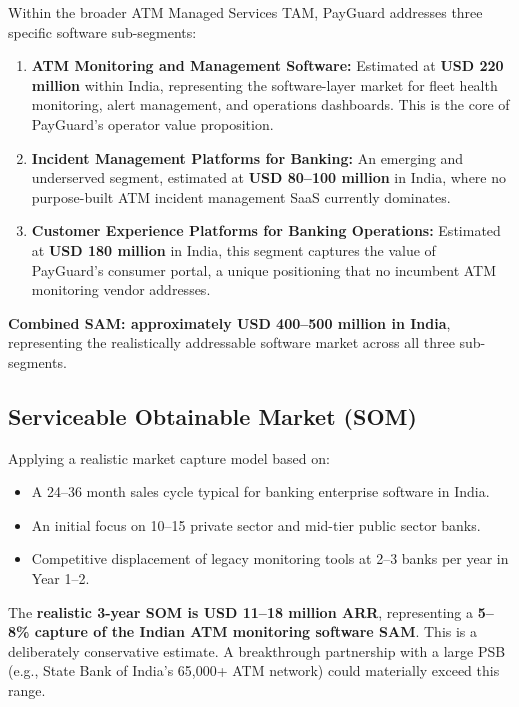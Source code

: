 \documentclass[12pt,a4paper]{article}
\begin{document}
Within the broader ATM Managed Services TAM, PayGuard addresses three specific software
sub-segments:

\begin{enumerate}
  \item \textbf{ATM Monitoring and Management Software:} Estimated at \textbf{USD 220 million}
        within India, representing the software-layer market for fleet health monitoring,
        alert management, and operations dashboards. This is the core of PayGuard's operator value
        proposition.
  \item \textbf{Incident Management Platforms for Banking:} An emerging and underserved segment,
        estimated at \textbf{USD 80--100 million} in India, where no purpose-built ATM incident
        management SaaS currently dominates.
  \item \textbf{Customer Experience Platforms for Banking Operations:} Estimated at
        \textbf{USD 180 million} in India, this segment captures the value of PayGuard's consumer
        portal, a unique positioning that no incumbent ATM monitoring vendor addresses.
\end{enumerate}

\textbf{Combined SAM: approximately USD 400--500 million in India}, representing the realistically
addressable software market across all three sub-segments.

\subsection{Serviceable Obtainable Market (SOM)}

Applying a realistic market capture model based on:
\begin{itemize}
  \item A 24--36 month sales cycle typical for banking enterprise software in India.
  \item An initial focus on 10--15 private sector and mid-tier public sector banks.
  \item Competitive displacement of legacy monitoring tools at 2--3 banks per year in Year 1--2.
\end{itemize}

The \textbf{realistic 3-year SOM is USD 11--18 million ARR}, representing a \textbf{5--8\% capture
of the Indian ATM monitoring software SAM}. This is a deliberately conservative estimate. A
breakthrough partnership with a large PSB (e.g., State Bank of India's 65,000+ ATM network)
could materially exceed this range.
\end{document}
